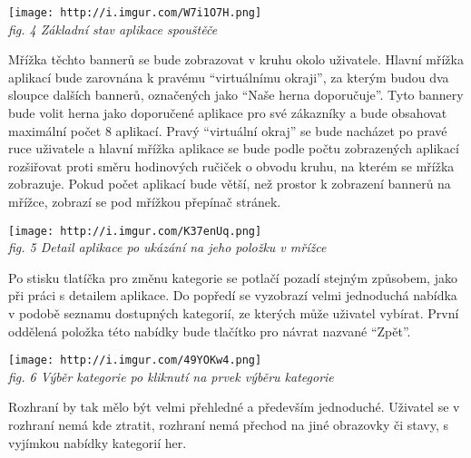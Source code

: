 \texttt{[image: http://i.imgur.com/W7i1O7H.png]}\\
\emph{fig. 4 Základní stav aplikace spouštěče}

Mřížka těchto bannerů se bude zobrazovat v kruhu okolo uživatele. Hlavní
mřížka aplikací bude zarovnána k pravému ``virtuálnímu okraji'', za
kterým budou dva sloupce dalších bannerů, označených jako ``Naše herna
doporučuje''. Tyto bannery bude volit herna jako doporučené aplikace pro
své zákazníky a bude obsahovat maximální počet 8 aplikací. Pravý
``virtuální okraj'' se bude nacházet po pravé ruce uživatele a hlavní
mřížka aplikace se bude podle počtu zobrazených aplikací rozšiřovat
proti směru hodinových ručiček o obvodu kruhu, na kterém se mřížka
zobrazuje. Pokud počet aplikací bude větší, než prostor k zobrazení
bannerů na mřížce, zobrazí se pod mřížkou přepínač stránek.

\texttt{[image: http://i.imgur.com/K37enUq.png]}\\
\emph{fig. 5 Detail aplikace po ukázání na jeho položku v mřížce}

Po stisku tlatíčka pro změnu kategorie se potlačí pozadí stejným
způsobem, jako při práci s detailem aplikace. Do popředí se vyzobrazí
velmi jednoduchá nabídka v podobě seznamu dostupných kategorií, ze
kterých může uživatel vybírat. První oddělená položka této nabídky bude
tlačítko pro návrat nazvané ``Zpět''.

\texttt{[image: http://i.imgur.com/49YOKw4.png]}\\
\emph{fig. 6 Výběr kategorie po kliknutí na prvek výběru kategorie}

Rozhraní by tak mělo být velmi přehledné a především jednoduché.
Uživatel se v rozhraní nemá kde ztratit, rozhraní nemá přechod na jiné
obrazovky či stavy, s vyjímkou nabídky kategorií her.
